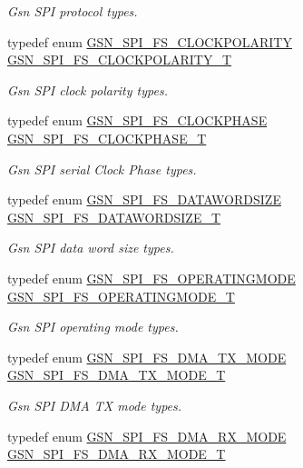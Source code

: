 \begin{DoxyCompactItemize}
\begin{DoxyCompactList}\small\item\em Gsn SPI protocol types. \end{DoxyCompactList}\item 
typedef enum \hyperlink{a00655_ga5d0a21479bf57ff38c1c967f95ea5e83}{GSN\_\-SPI\_\-FS\_\-CLOCKPOLARITY} \hyperlink{a00655_ga68952a1f7c2baa0ffb682a9689229eaf}{GSN\_\-SPI\_\-FS\_\-CLOCKPOLARITY\_\-T}
\begin{DoxyCompactList}\small\item\em Gsn SPI clock polarity types. \end{DoxyCompactList}\item 
typedef enum \hyperlink{a00655_gae764e5eefaf1dedaf1561a7cd3ccb6aa}{GSN\_\-SPI\_\-FS\_\-CLOCKPHASE} \hyperlink{a00655_gaf3bb2adb7491e3d235c486d48f1b506d}{GSN\_\-SPI\_\-FS\_\-CLOCKPHASE\_\-T}
\begin{DoxyCompactList}\small\item\em Gsn SPI serial Clock Phase types. \end{DoxyCompactList}\item 
typedef enum \hyperlink{a00655_ga14e8640824b36f8fbc046289a0fef146}{GSN\_\-SPI\_\-FS\_\-DATAWORDSIZE} \hyperlink{a00655_gaad2f137ab7bba85003348a4b895e435d}{GSN\_\-SPI\_\-FS\_\-DATAWORDSIZE\_\-T}
\begin{DoxyCompactList}\small\item\em Gsn SPI data word size types. \end{DoxyCompactList}\item 
typedef enum \hyperlink{a00655_ga9ef97e579e4f3e5d828b8bc2c0c58d73}{GSN\_\-SPI\_\-FS\_\-OPERATINGMODE} \hyperlink{a00655_gab173e44df6afa7f56b96f3a05cb857a5}{GSN\_\-SPI\_\-FS\_\-OPERATINGMODE\_\-T}
\begin{DoxyCompactList}\small\item\em Gsn SPI operating mode types. \end{DoxyCompactList}\item 
typedef enum \hyperlink{a00655_ga6654fba1f3e49677837484ec989da884}{GSN\_\-SPI\_\-FS\_\-DMA\_\-TX\_\-MODE} \hyperlink{a00655_ga6203f693749188e8f14ff1675d2eb40f}{GSN\_\-SPI\_\-FS\_\-DMA\_\-TX\_\-MODE\_\-T}
\begin{DoxyCompactList}\small\item\em Gsn SPI DMA TX mode types. \end{DoxyCompactList}\item 
typedef enum \hyperlink{a00655_ga82f3e42cd7181328045726b29cf916c6}{GSN\_\-SPI\_\-FS\_\-DMA\_\-RX\_\-MODE} \hyperlink{a00655_ga9bb270ede7d3ddae0e748f7927ad00bd}{GSN\_\-SPI\_\-FS\_\-DMA\_\-RX\_\-MODE\_\-T}

\end{DoxyCompactItemize}
